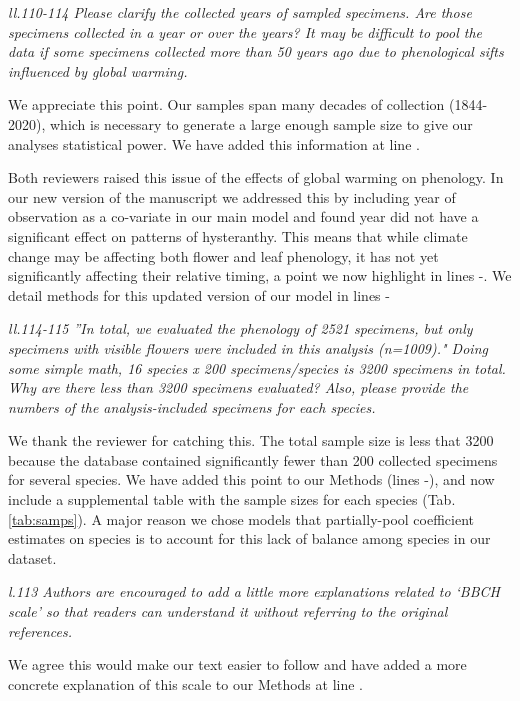 \documentclass{article}[12pt]
\begin{document}
\emph{ll.110-114 Please clarify the collected years of sampled specimens. Are those specimens collected in a year or over the years? It may be difficult to pool the data if some specimens collected more than 50 years ago due to phenological sifts influenced by global warming.}

We appreciate this point. Our samples span many decades of collection (1844-2020), which is necessary to generate a large enough sample size to give our analyses statistical power. We have added this information at line .

Both reviewers raised this issue of the effects of global warming on phenology. In our new version of the manuscript we addressed this by including year of observation as a co-variate in our main model and found year did not have a significant effect on patterns of hysteranthy. This means that while climate change may be affecting both flower and leaf phenology, it has not yet significantly affecting their relative timing, a point we now highlight in lines -. We detail methods for this updated version of our model in lines -

\emph{ll.114-115 ''In total, we evaluated the phenology of 2521 specimens, but only specimens with visible flowers were included in this analysis (n=1009)." Doing some simple math, 16 species x 200 specimens/species is 3200 specimens in total. Why are there less than 3200 specimens evaluated? Also, please provide the numbers of the analysis-included specimens for each species.}

We thank the reviewer for catching this. The total sample size is less that 3200 because the database contained significantly fewer than 200 collected specimens for several species. We have added this point to our Methods (lines -), and now include a supplemental table with the sample sizes for each species (Tab. \ref{tab:samps}). A major reason we chose models that partially-pool coefficient estimates on species is to account for this lack of balance among species in our dataset.

\emph{l.113 Authors are encouraged to add a little more explanations related to ‘BBCH scale’ so that readers can understand it without referring to the original references.}

We agree this would make our text easier to follow and have added a more concrete explanation of this scale to our Methods at line  .
\end{document}
